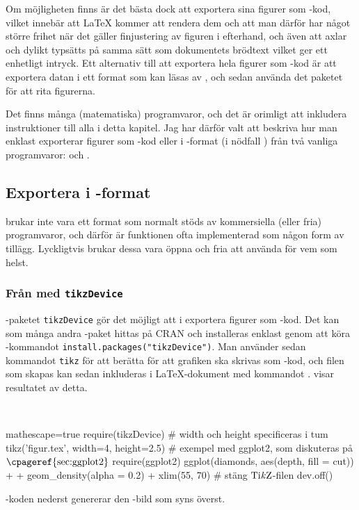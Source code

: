 \documentclass[10pt,../../a4.tex]{subfiles}
\begin{document}
Om möjligheten finns är det bästa dock att exportera sina figurer som
\PGFTikZ-kod, vilket innebär att \LaTeX{} kommer att rendera dem och att
man därför har något större frihet när det gäller finjustering av figuren
i efterhand, och även att axlar och dylikt typsätts på samma sätt som
dokumentets brödtext vilket ger ett enhetligt intryck. Ett alternativ
till att exportera hela figurer som \PGFTikZ-kod är att exportera datan
i ett format som kan läsas av , och sedan använda det
paketet för att rita figurerna.

Det finns många (matematiska) programvaror, och det är orimligt att
inkludera instruktioner till alla i detta kapitel. Jag har därför valt
att beskriva hur man enklast exporterar figurer som \PGFTikZ-kod eller
i \PDF-format (i nödfall \PNG) från två vanliga programvaror:
\Rlogo och \MATLAB.

\subsection{Exportera i \PGFTikZ-format}
\PGFTikZ brukar inte vara ett format som normalt stöds av kommersiella
(eller fria) programvaror, och därför är funktionen ofta implementerad
som någon form av tillägg. Lyckligtvis brukar dessa vara öppna och fria
att använda för vem som helst.

\subsubsection*{Från \Rlogo med \texttt{tikzDevice}}
\Rlogo-paketet \texttt{tikzDevice} \parencite{Sharpsteen12} gör det möjligt
att i \Rlogo exportera figurer som \PGFTikZ-kod. Det kan som många andra
\Rlogo-paket hittas på CRAN och installeras enklast genom att köra
\Rlogo-kommandot \verb|install.packages("tikzDevice")|. Man använder
sedan kommandot \texttt{tikz} för att berätta för \Rlogo att grafiken
ska skrivas som \PGFTikZ-kod, och filen som skapas kan sedan inkluderas
i \LaTeX-dokument med kommandot .
 visar resultatet av detta.

\begin{kod}[tbp]
	\centering
	\begin{minipage}{\textwidth}
		\centering
		
	\end{minipage}
	\\[1ex]
	\begin{minipage}{\textwidth}
		\begin{rcode*}{mathescape=true}
require(tikzDevice)
# width och height specificeras i tum
tikz('figur.tex', width=4, height=2.5)
# exempel med ggplot2, som diskuteras på $\text{\cpageref{sec:ggplot2}}$
require(ggplot2)
ggplot(diamonds, aes(depth, fill = cut)) +
  + geom_density(alpha = 0.2) + xlim(55, 70)
# stäng $\text{Ti\textit{k}Z}$-filen
dev.off()
		\end{rcode*}
	\end{minipage}
	\caption{\Rlogo-koden nederst genererar den \PGFTikZ-bild som
	syns överst.}
	\label{ex:tikzdevice}
\end{kod}
\end{document}
